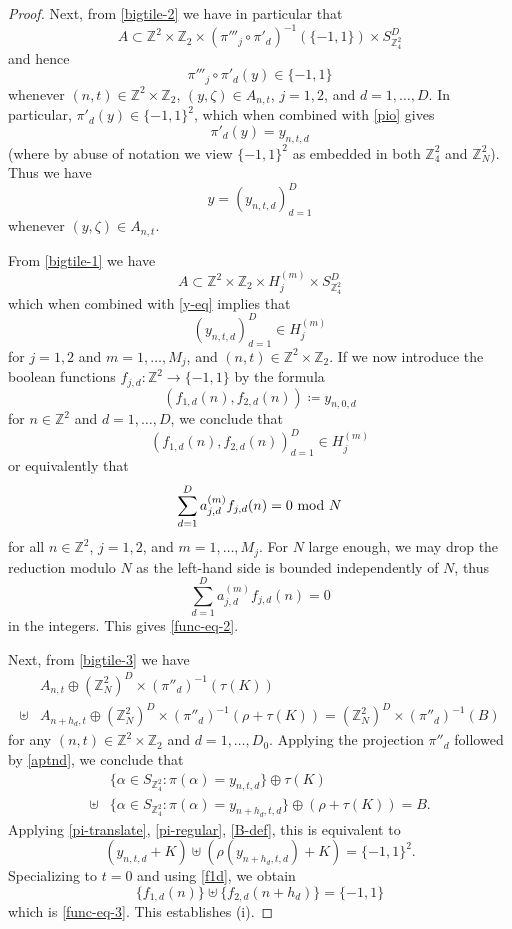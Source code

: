 \documentclass[reqno,a4paper,12pt]{amsart}
\numberwithin{equation}{section}
\numberwithin{figure}{section}
\def\Z{\mathbb{Z}}
\theoremstyle{plain}
\theoremstyle{definition}
\begin{document}
\begin{proof}
Next, from \eqref{bigtile-2} we have in particular that
$$
A \subset \Z^2 \times \Z_2 \times (\pi'''_j \circ \pi'_d)^{-1}(\{-1,1\}) \times S_{\Z_4^2}^{D}$$
and hence
$$ \pi'''_j \circ \pi'_d( y ) \in \{-1,1\}$$
whenever $(n,t) \in \Z^2 \times \Z_2$, $(y,\zeta) \in A_{n,t}$, $j=1,2$, and $d=1,\dots,D$.  In particular, $\pi'_d(y) \in \{-1,1\}^2$, which when combined with
\eqref{pio} gives
$$ \pi'_d(y) = y_{n,t,d}$$
(where by abuse of notation we view $\{-1,1\}^2$ as embedded in both $\Z_4^2$ and $\Z_N^2$).  Thus we have
\begin{equation}\label{y-eq}
y = (y_{n,t,d})_{d=1}^D
\end{equation}
whenever $(y,\zeta) \in A_{n,t}$.

From \eqref{bigtile-1} we have
$$
A \subset \Z^2 \times \Z_2 \times H_j^{(m)} \times S_{\Z_4^2}^{D}$$
which when combined with \eqref{y-eq} implies that
$$ (y_{n,t,d})_{d=1}^D \in H_j^{(m)}$$
for $j=1,2$ and $m=1,\dots,M_j$, and $(n,t) \in \Z^2 \times \Z_2$.  If we now introduce the boolean functions $f_{j,d} \colon \Z^2 \to \{-1,1\}$ by the formula
\begin{equation}\label{f1d}
(f_{1,d}(n), f_{2,d}(n)) \coloneqq y_{n,0,d}
\end{equation}
for $n \in \Z^2$ and $d=1,\dots,D$, we conclude that
$$ (f_{1,d}(n), f_{2,d}(n))_{d=1}^D \in H_j^{(m)}$$
or equivalently that
$$ \sum_{d=1}^D a_{j,d}^{(m)} f_{j,d}(n) = 0 \hbox{ mod } N$$
for all $n \in \Z^2$, $j=1,2$, and $m=1,\dots,M_j$.  For $N$ large enough, we may drop the reduction modulo $N$ as the left-hand side is bounded independently of $N$, thus
$$ \sum_{d=1}^D a_{j,d}^{(m)} f_{j,d}(n) = 0 $$
in the integers.  This gives \eqref{func-eq-2}.

Next, from \eqref{bigtile-3}  we have
\begin{align*}
&A_{n,t} \oplus (\Z_N^2)^D \times (\pi''_d)^{-1}(\tau(K))\\
\uplus & A_{n+h_d,t} \oplus (\Z_N^2)^D \times (\pi''_d)^{-1}(\rho + \tau(K))
= (\Z_N^2)^D \times (\pi''_d)^{-1}(B)
\end{align*}
for any $(n,t) \in \Z^2 \times \Z_2$ and $d=1,\dots,D_0$.  Applying the projection $\pi''_d$ followed by \eqref{aptnd}, we conclude that
\begin{align*}
&\{ \alpha \in S_{\Z_4^2}: \pi(\alpha) = y_{n,t,d}\} \oplus \tau(K) \\
\uplus&
\{ \alpha \in S_{\Z_4^2}: \pi(\alpha) = y_{n+h_d,t,d}\} \oplus (\rho + \tau(K)) = B.
\end{align*}
Applying \eqref{pi-translate}, \eqref{pi-regular}, \eqref{B-def}, this is equivalent to
$$ (y_{n,t,d} + K) \uplus (\rho(y_{n+h_d,t,d}) + K) = \{-1,1\}^2.$$
Specializing to $t=0$ and using \eqref{f1d}, we obtain
$$ \{f_{1,d}(n)\} \uplus \{ f_{2,d}(n+h_d)\} = \{-1,1\}$$
which is \eqref{func-eq-3}.  This establishes (i).
\end{proof}
\end{document}
